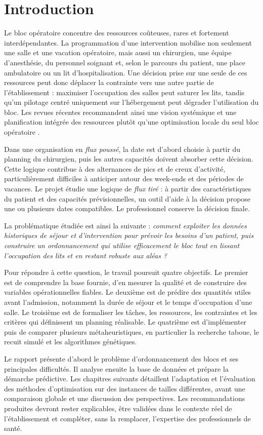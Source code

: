 \chapter*{Introduction}

Le bloc opératoire concentre des ressources coûteuses, rares et fortement interdépendantes. La programmation d'une intervention mobilise non seulement une salle et une vacation opératoire, mais aussi un chirurgien, une équipe d'anesthésie, du personnel soignant et, selon le parcours du patient, une place ambulatoire ou un lit d'hospitalisation. Une décision prise sur une seule de ces ressources peut donc déplacer la contrainte vers une autre partie de l'établissement : maximiser l'occupation des salles peut saturer les lits, tandis qu'un pilotage centré uniquement sur l'hébergement peut dégrader l'utilisation du bloc. Les revues récentes recommandent ainsi une vision systémique et une planification intégrée des ressources plutôt qu'une optimisation locale du seul bloc opératoire \parencite{rachuba2024,schouten2023}.

Dans une organisation en \emph{flux poussé}, la date est d'abord choisie à partir du planning du chirurgien, puis les autres capacités doivent absorber cette décision. Cette logique contribue à des alternances de pics et de creux d'activité, particulièrement difficiles à anticiper autour des week-ends et des périodes de vacances. Le projet étudie une logique de \emph{flux tiré} : à partir des caractéristiques du patient et des capacités prévisionnelles, un outil d'aide à la décision propose une ou plusieurs dates compatibles. Le professionnel conserve la décision finale.

La problématique étudiée est ainsi la suivante : \emph{comment exploiter les données historiques de séjour et d'intervention pour prévoir les besoins d'un patient, puis construire un ordonnancement qui utilise efficacement le bloc tout en lissant l'occupation des lits et en restant robuste aux aléas ?}

Pour répondre à cette question, le travail poursuit quatre objectifs. Le premier est de comprendre la base fournie, d'en mesurer la qualité et de construire des variables opérationnelles fiables. Le deuxième est de prédire des quantités utiles avant l'admission, notamment la durée de séjour et le temps d'occupation d'une salle. Le troisième est de formaliser les tâches, les ressources, les contraintes et les critères qui définissent un planning réalisable. Le quatrième est d'implémenter puis de comparer plusieurs métaheuristiques, en particulier la recherche taboue, le recuit simulé et les algorithmes génétiques.

Le rapport présente d'abord le problème d'ordonnancement des blocs et ses principales difficultés. Il analyse ensuite la base de données et prépare la démarche prédictive. Les chapitres suivants détaillent l'adaptation et l'évaluation des méthodes d'optimisation sur des instances de tailles différentes, avant une comparaison globale et une discussion des perspectives. Les recommandations produites devront rester explicables, être validées dans le contexte réel de l'établissement et compléter, sans la remplacer, l'expertise des professionnels de santé.
